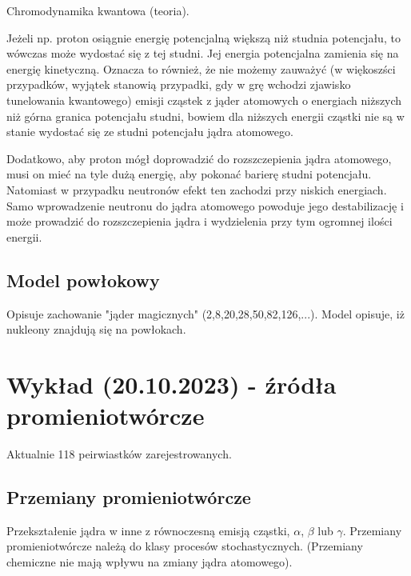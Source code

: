 \documentclass{article}
\begin{document}
Chromodynamika kwantowa (teoria).

Jeżeli np. proton osiągnie energię potencjalną większą niż studnia potencjału, to wówczas może wydostać się z tej studni. Jej energia potencjalna zamienia się na energię kinetyczną. Oznacza to również, że nie możemy zauważyć (w więkoszści przypadków, wyjątek stanowią przypadki, gdy w grę wchodzi zjawisko tunelowania kwantowego) emisji cząstek z jąder atomowych o energiach niższych niż górna granica potencjału studni, bowiem dla niższych energii cząstki nie są w stanie wydostać się ze studni potencjału jądra atomowego.

Dodatkowo, aby proton mógł doprowadzić do rozszczepienia jądra atomowego, musi on mieć na tyle dużą energię, aby pokonać barierę studni potencjału. Natomiast w przypadku neutronów efekt ten zachodzi przy niskich energiach. Samo wprowadzenie neutronu do jądra atomowego powoduje jego destabilizację i może prowadzić do rozszczepienia jądra i wydzielenia przy tym ogromnej ilości energii.

\subsection{Model powłokowy}
Opisuje zachowanie "jąder magicznych" (2,8,20,28,50,82,126,...).
Model opisuje, iż nukleony znajdują się na powłokach.

\section{Wykład (20.10.2023) - źródła promieniotwórcze}

Aktualnie 118 peirwiastków zarejestrowanych.

\subsection{Przemiany promieniotwórcze}

Przekształenie jądra w inne z równoczesną emisją cząstki, $\alpha$, $\beta$ lub $\gamma$. Przemiany promieniotwórcze należą do klasy procesów stochastycznych.  (Przemiany chemiczne nie mają wpływu na zmiany jądra atomowego).
\end{document}
